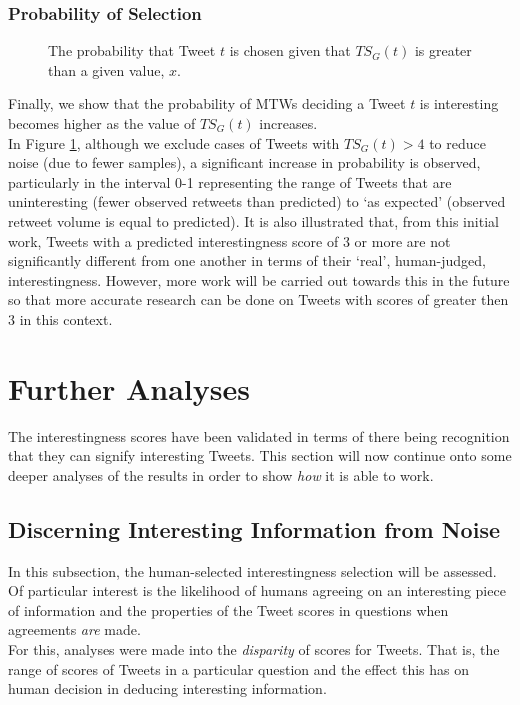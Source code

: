 \begin{enumerate}
\subsubsection{Probability of Selection}

\begin{figure}[h]
\caption{The probability that Tweet $t$ is chosen given that $TS_G(t)$ is greater than a given value, $x$.}
\label{fig:score-cum-dist}
\end{figure}

Finally, we show that the probability of MTWs deciding a Tweet $t$ is interesting becomes higher as the value of $TS_G(t)$ increases. \\
In Figure \ref{fig:score-cum-dist}, although we exclude cases of Tweets with $TS_G(t) > 4$ to reduce noise (due to fewer samples), a significant increase in probability is observed, particularly in the interval 0-1 representing the range of Tweets that are uninteresting (fewer observed retweets than predicted) to `as expected' (observed retweet volume is equal to predicted). It is also illustrated that, from this initial work, Tweets with a predicted interestingness score of 3 or more are not significantly different from one another in terms of their `real', human-judged, interestingness. However, more work will be carried out towards this in the future so that more accurate research can be done on Tweets with scores of greater then 3 in this context.


\section{Further Analyses}
The interestingness scores have been validated in terms of there being recognition that they can signify interesting Tweets. This section will now continue onto some deeper analyses of the results in order to show \textit{how} it is able to work.

\subsection{Discerning Interesting Information from Noise}
In this subsection, the human-selected interestingness selection will be assessed. Of particular interest is the likelihood of humans agreeing on an interesting piece of information and the properties of the Tweet scores in questions when agreements \textit{are} made. \\
For this, analyses were made into the \textit{disparity} of scores for Tweets. That is, the range of scores of Tweets in a particular question and the effect this has on human decision in deducing interesting information.


\end{enumerate}
